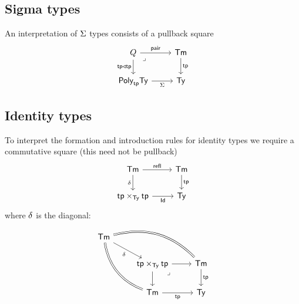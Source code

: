 
\subsection{Sigma types}

An interpretation of $\Sigma$ types consists of a pullback square
\[\begin{tikzcd}
	Q & \Term \\
	{\Poly{\tp}{\Type}} & \Type
	\arrow["\pair", from=1-1, to=1-2]
	\arrow["{\tp \triangleleft \tp}"', from=1-1, to=2-1]
	\arrow["\lrcorner"{anchor=center, pos=0.125}, draw=none, from=1-1, to=2-2]
	\arrow["\tp", from=1-2, to=2-2]
	\arrow["\Si"', from=2-1, to=2-2]
\end{tikzcd}\]


\subsection{Identity types}

To interpret the formation and introduction rules for identity types
we require a commutative square (this need not be pullback)
\[\begin{tikzcd}
	\Term & \Term \\
	{\tp \times_\Type \tp} & \Type
	\arrow["\refl", from=1-1, to=1-2]
	\arrow["\de"', from=1-1, to=2-1]
	\arrow["\tp", from=1-2, to=2-2]
	\arrow["\Id"', from=2-1, to=2-2]
\end{tikzcd}\]
where $\delta$ is the diagonal:
\[\begin{tikzcd}
	\Term \\
	& {\tp \times_\Type \tp} & \Term \\
	& \Term & \Type
	\arrow["\de"', from=1-1, to=2-2]
	\arrow[Rightarrow, no head, bend left, from=1-1, to=2-3]
	\arrow[Rightarrow, no head, bend right, from=1-1, to=3-2]
	\arrow[from=2-2, to=2-3]
	\arrow[from=2-2, to=3-2]
	\arrow["\lrcorner"{anchor=center, pos=0.125}, draw=none, from=2-2, to=3-3]
	\arrow["\tp", from=2-3, to=3-3]
	\arrow["\tp"', from=3-2, to=3-3]
\end{tikzcd}\]

